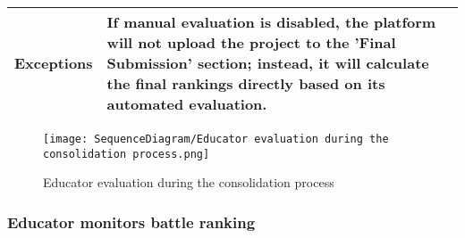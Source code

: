 \begin{longtable}{|c| p{10cm}|}
                             
                                \\
        \hline
         Exceptions & If manual evaluation is disabled, the platform will not upload the project to the 'Final Submission' section; instead, it will calculate the final rankings directly based on its automated evaluation.\\
             \hline
         
            
    \end{longtable}

\begin{figure}[H]
  \texttt{[image: SequenceDiagram/Educator evaluation during the consolidation process.png]} 
  \caption{Educator evaluation during the consolidation process}
  \label{fig:immagine}
\end{figure}




\newpage
\subsubsection{Educator monitors battle ranking}

